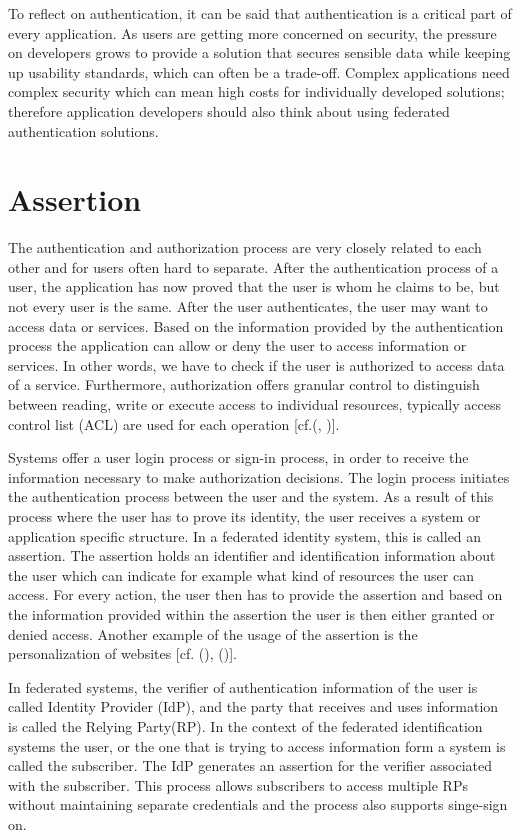 To reflect on authentication, it can be said that authentication is a critical part of every application. As users are getting more concerned on security, the pressure on developers grows to provide a solution that secures sensible data while keeping up usability standards, which can often be a trade-off. Complex applications need complex security which can mean high costs for individually developed solutions; therefore application developers should also think about using federated authentication solutions.


\section{Assertion}
\label{assertion}
The authentication and authorization process are very closely related to each other and for users often hard to separate. After the authentication process of a user, the application has now proved that the user is whom he claims to be, but not every user is the same. After the user authenticates, the user may want to access data or services. Based on the information provided by the authentication process the application can allow or deny the user to access information or services. In other words, we have to check if the user is authorized to access data of a service. Furthermore, authorization offers granular control to distinguish between reading, write or execute access to individual resources, typically access control list (ACL) are used for each operation [cf.(\cite{Todorov:2007:MUI}, \cite{Boyed:2012:GSOA})].

Systems offer a user login process or sign-in process, in order to receive the information necessary to make authorization decisions. The login process initiates the authentication process between the user and the system. As a result of this process where the user has to prove its identity, the user receives a system or application specific structure. In a federated identity system, this is called an assertion. The assertion holds an identifier and identification information about the user which can indicate for example what kind of resources the user can access. For every action, the user then has to provide the assertion and based on the information provided within the assertion the user is then either granted or denied access. Another example of the usage of the assertion is the personalization of websites [cf. (\cite{Todorov:2007:MUI}), (\cite{NIST:2017:DIG})].

In federated systems, the verifier of authentication information of the user is called Identity Provider (IdP), and the party that receives and uses information is called the Relying Party(RP). In the context of the federated identification systems the user, or the one that is trying to access information form a system is called the subscriber. The IdP generates an assertion for the verifier associated with the subscriber. This process allows subscribers to access multiple RPs without maintaining separate credentials and the process also supports singe-sign on. \cite{NIST:2017:DIGFA}

